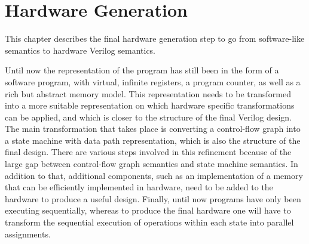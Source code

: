 \chapter{Hardware Generation}%
\label{sec:hardware-generation}

\begin{chapsummary}
  This chapter describes the final hardware generation step to go from
  software-like semantics to hardware Verilog semantics.
\end{chapsummary}

\noindent Until now the representation of the program has still been in the form
of a software program, with virtual, infinite registers, a program counter, as
well as a rich but abstract memory model.  This representation needs to be
transformed into a more suitable representation on which hardware specific
transformations can be applied, and which is closer to the structure of the
final Verilog design.  The main transformation that takes place is converting a
control-flow graph into a state machine with data path representation, which is
also the structure of the final design.  There are various steps involved in
this refinement because of the large gap between control-flow graph semantics
and state machine semantics.  In addition to that, additional components, such
as an implementation of a memory that can be efficiently implemented in
hardware, need to be added to the hardware to produce a useful design.  Finally,
until now programs have only been executing sequentially, whereas to produce the
final hardware one will have to transform the sequential execution of operations
within each state into parallel assignments.

